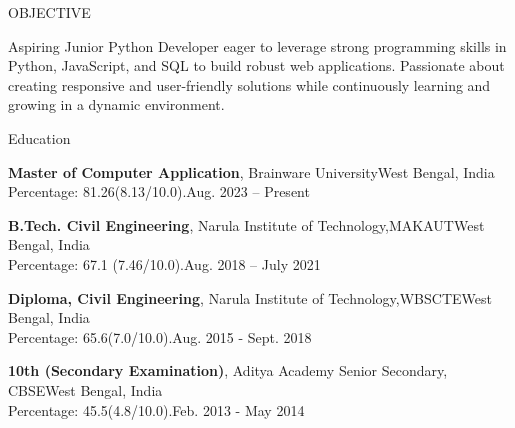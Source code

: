 \documentclass{resume} %
\begin{document}

\begin{rSection}{OBJECTIVE}

{Aspiring Junior Python Developer eager to leverage strong programming skills in Python, JavaScript, and SQL to build robust web applications. Passionate about creating responsive and user-friendly solutions while continuously learning and growing in a dynamic environment.}


\end{rSection}

\begin{rSection}{Education}

{\bf Master of Computer Application}, Brainware University\hfill West Bengal, India \\
Percentage: 81.26(8.13/10.0).\hfill {Aug. 2023 -- Present}


{\bf B.Tech. Civil Engineering}, Narula Institute of Technology,MAKAUT\hfill West Bengal, India \\
Percentage: 67.1 (7.46/10.0).\hfill {Aug. 2018 -- July 2021}

{\bf Diploma, Civil Engineering}, Narula Institute of Technology,WBSCTE\hfill West Bengal, India \\
Percentage: 65.6(7.0/10.0).\hfill {Aug. 2015 - Sept. 2018 }

{\bf 10th (Secondary Examination)}, Aditya Academy Senior Secondary, CBSE\hfill West Bengal, India \\
Percentage: 45.5(4.8/10.0).\hfill {Feb. 2013 - May 2014}


\end{rSection}
\end{document}

